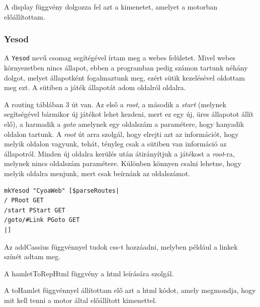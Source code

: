 \documentclass[12pt,a4paper,oneside]{report}
\newcommand{\proglang}{\texttt}
\begin{document}
      A display függvény dolgozza fel azt a kimenetet, amelyet a
      motorban előállítottam.
    \subsubsection{Yesod}
      A \proglang{Yesod} nevű csomag segítégével írtam meg a webes
      felületet. Mivel webes környezetben nincs állapot, ebben a
      programban pedig számon tartunk néhány dolgot, melyet állapotként
      fogalmaztunk meg, ezért sütik kezelésével oldottam meg ezt. A
      sütiben a játék állapotát adom oldalról oldalra.

      A routing táblában 3 út van. Az első a \emph{root}, a második a \emph{start}
      (melynek segítségével bármikor új játékot lehet kezdeni, mert ez
      egy új, üres állapotot állít elő), a harmadik a \emph{goto} amelynek
      egy oldalszám a paramétere, hogy hanyadik oldalon tartunk. A
      \emph{root} út arra szolgál, hogy elrejti azt az információt, hogy
      melyik oldalon vagyunk, tehát, tényleg csak a sütiben van
      információ az állapotról. Minden új oldalra kerülés után
      átirányítjuk a játékost a \emph{root}-ra, melynek nincs oldalszám
      paramétere. Különben könnyen csalni lehetne, hogy melyik oldalra
      menjunk, mert csak beírnánk az oldalszámot.
      \begin{verbatim}
mkYesod "CyoaWeb" [$parseRoutes|
/ PRoot GET
/start PStart GET
/goto/#Link PGoto GET
|]
      \end{verbatim}
      Az addCassius függvénnyel tudok css-t hozzáadni, melyben például
      a linkek színét adtam meg.

      A hamletToRepHtml függvény a html leírására szolgál.

      A toHamlet függvénnyel állítottam elő azt a html kódot, amely
      megmondja, hogy mit kell tenni a motor által előállított kimenettel.

  
\end{document}
